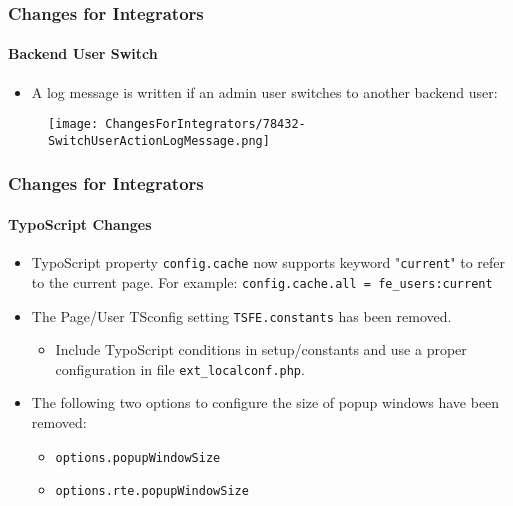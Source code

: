 \begin{frame}[fragile]
	\frametitle{Changes for Integrators}
	\framesubtitle{Backend User Switch}

	\begin{itemize}
		\item A log message is written if an admin user switches to another backend user:
	\end{itemize}

	\begin{figure}
		\texttt{[image: ChangesForIntegrators/78432-SwitchUserActionLogMessage.png]}
	\end{figure}

\end{frame}


\begin{frame}[fragile]
	\frametitle{Changes for Integrators}
	\framesubtitle{TypoScript Changes}

	\begin{itemize}
		\item TypoScript property \texttt{config.cache} now supports keyword
			"\texttt{current}" to refer to the current page. For example:\newline
			\smaller\texttt{config.cache.all = fe\_users:current}\normalsize

		\item The Page/User TSconfig setting \texttt{TSFE.constants} has been removed.

			\begin{itemize}\smaller
				\item[\ding{228}] Include TypoScript conditions in setup/constants and use a proper configuration in file \texttt{ext\_localconf.php}.
			\end{itemize}

		\item The following two options to configure the size of popup windows have been removed:

			\begin{itemize}
				\item \texttt{options.popupWindowSize}
				\item \texttt{options.rte.popupWindowSize}
			\end{itemize}

	\end{itemize}

\end{frame}

